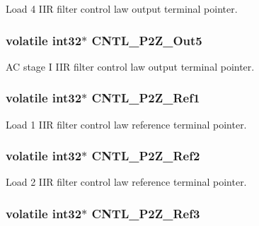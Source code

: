 Load 4 I\-I\-R filter control law output terminal pointer. \hypertarget{a00014_a3b336a91d25a7feb9f8927b32b800d0d}{
\subsubsection[{C\-N\-T\-L\-\_\-2\-P2\-Z\-\_\-\-Out5}]{\setlength{\rightskip}{0pt plus 5cm}volatile int32$\ast$ C\-N\-T\-L\-\_\-P2\-Z\-\_\-\-Out5}}\label{a00014_a3b336a91d25a7feb9f8927b32b800d0d}
A\-C stage I I\-I\-R filter control law output terminal pointer. \hypertarget{a00014_a98527ce76f5175fa2933d46f324d85fb}{
\subsubsection[{C\-N\-T\-L\-\_\-2\-P2\-Z\-\_\-\-Ref1}]{\setlength{\rightskip}{0pt plus 5cm}volatile int32$\ast$ C\-N\-T\-L\-\_\-P2\-Z\-\_\-\-Ref1}}\label{a00014_a98527ce76f5175fa2933d46f324d85fb}
Load 1 I\-I\-R filter control law reference terminal pointer. \hypertarget{a00014_a9bf1756a901a3a74d9f43a51f85cede4}{
\subsubsection[{C\-N\-T\-L\-\_\-2\-P2\-Z\-\_\-\-Ref2}]{\setlength{\rightskip}{0pt plus 5cm}volatile int32$\ast$ C\-N\-T\-L\-\_\-P2\-Z\-\_\-\-Ref2}}\label{a00014_a9bf1756a901a3a74d9f43a51f85cede4}
Load 2 I\-I\-R filter control law reference terminal pointer. \hypertarget{a00014_a859e9bbd5bc82f1b42863a93e4f992af}{
\subsubsection[{C\-N\-T\-L\-\_\-2\-P2\-Z\-\_\-\-Ref3}]{\setlength{\rightskip}{0pt plus 5cm}volatile int32$\ast$ C\-N\-T\-L\-\_\-P2\-Z\-\_\-\-Ref3}}\label{a00014_a859e9bbd5bc82f1b42863a93e4f992af}
